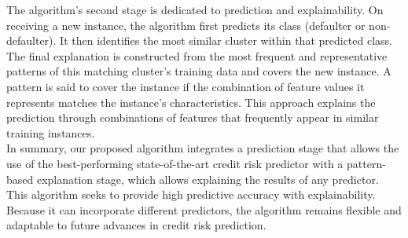 {        The algorithm's second stage is dedicated to prediction and explainability. On receiving a new instance, the algorithm first predicts its class (defaulter or non-defaulter). It then identifies the most similar cluster within that predicted class. The final explanation is constructed from the most frequent and representative patterns of this matching cluster's training data and covers the new instance. A pattern is said to cover the instance if the combination of feature values it represents matches the instance’s characteristics. This approach explains the prediction through combinations of features that frequently appear in similar training instances.\\
    
        In summary, our proposed algorithm integrates a prediction stage that allows the use of the best-performing state-of-the-art credit risk predictor with a pattern-based explanation stage, which allows explaining the results of any predictor. This algorithm seeks to provide high predictive accuracy with explainability. Because it can incorporate different predictors, the algorithm remains flexible and adaptable to future advances in credit risk prediction.\\
}
